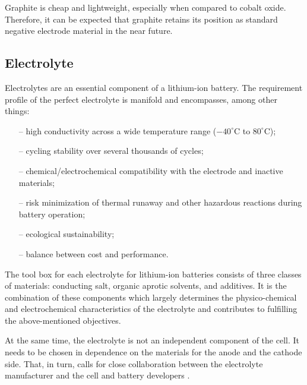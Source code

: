 Graphite is cheap and lightweight, especially when compared to cobalt oxide. Therefore, it can be expected that graphite retains its position as standard negative electrode material in the near future.

\subsection{Electrolyte}
\label{sec:electrolyte}
Electrolytes are an essential component of a lithium-ion battery. The requirement profile of the perfect electrolyte is manifold and encompasses, among other things:
\begin{itemize}
    \item[--] high conductivity across a wide temperature range ($-40^\circ$C to $80^\circ$C);
    \item[--] cycling stability over several thousands of cycles;
    \item[--] chemical/electrochemical compatibility with the electrode and inactive materials;
    \item[--] risk minimization of thermal runaway and other hazardous reactions during battery operation;
    \item[--] ecological sustainability;
    \item[--] balance between cost and performance.
\end{itemize}
The tool box for each electrolyte for lithium-ion batteries consists of three classes of materials: conducting salt, organic aprotic solvents, and additives. It is the combination of these components which largely determines the physico-chemical and electrochemical characteristics of the electrolyte and contributes to fulfilling the above-mentioned objectives. 

At the same time, the electrolyte is not an independent component of the cell. It needs to be chosen in dependence on the materials for the anode and the cathode side. That, in turn, calls for close collaboration between the electrolyte manufacturer and the cell and battery developers \cite{korthauer2018lithium}.

